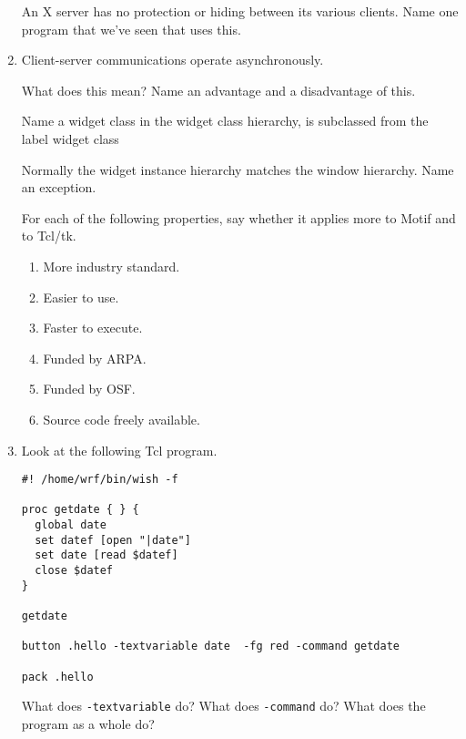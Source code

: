 \documentclass[twoside]{article}
\begin{document}
\begin{enumerate}
An X server has no protection or hiding between its various
clients.  Name one program that we've seen that uses this.


\item
Client-server communications operate asynchronously.  
\begin{enumerate}
 What does this mean?
Name an advantage and a disadvantage of this.
\end{enumerate}


Name a widget class in the widget class hierarchy, is
subclassed from the label widget class


 Normally the widget instance hierarchy matches the window
hierarchy.  Name an exception. 



For each of the following  properties, say whether it applies more to Motif
and to Tcl/tk.

\begin{enumerate}
\item More industry standard.
\item Easier to use.
\item Faster to execute.
\item Funded by ARPA.
\item Funded by OSF.
\item Source code freely available.
\end{enumerate}

\item  Look at the following Tcl program.

\begin{verbatim}
#! /home/wrf/bin/wish -f

proc getdate { } {
  global date
  set datef [open "|date"]
  set date [read $datef] 
  close $datef
}

getdate

button .hello -textvariable date  -fg red -command getdate

pack .hello 
\end{verbatim}
 
\begin{enumerate}

 What does \texttt{-textvariable} do?
 What does \texttt{-command} do?
 What does the program as a whole do?
\end{enumerate}





\end{enumerate}
\end{document}
